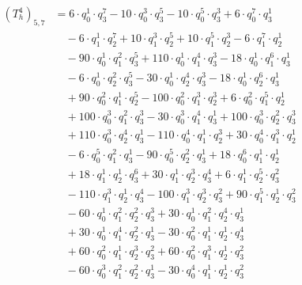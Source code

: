 \begin{align*}(T_{h}^4)_{5,7}&=6\cdot q_0^{1}\cdot q_3^{7}-10\cdot q_0^{3}\cdot q_3^{5}-10\cdot q_0^{5}\cdot q_3^{3}+6\cdot q_0^{7}\cdot q_3^{1}\\
&\quad -6\cdot q_1^{1}\cdot q_2^{7}+10\cdot q_1^{3}\cdot q_2^{5}+10\cdot q_1^{5}\cdot q_2^{3}-6\cdot q_1^{7}\cdot q_2^{1}\\
&\quad -90\cdot q_0^{1}\cdot q_1^{2}\cdot q_3^{5}+110\cdot q_0^{1}\cdot q_1^{4}\cdot q_3^{3}-18\cdot q_0^{1}\cdot q_1^{6}\cdot q_3^{1}\\
&\quad -6\cdot q_0^{1}\cdot q_2^{2}\cdot q_3^{5}-30\cdot q_0^{1}\cdot q_2^{4}\cdot q_3^{3}-18\cdot q_0^{1}\cdot q_2^{6}\cdot q_3^{1}\\
&\quad +90\cdot q_0^{2}\cdot q_1^{1}\cdot q_2^{5}-100\cdot q_0^{2}\cdot q_1^{3}\cdot q_2^{3}+6\cdot q_0^{2}\cdot q_1^{5}\cdot q_2^{1}\\
&\quad +100\cdot q_0^{3}\cdot q_1^{2}\cdot q_3^{3}-30\cdot q_0^{3}\cdot q_1^{4}\cdot q_3^{1}+100\cdot q_0^{3}\cdot q_2^{2}\cdot q_3^{3}\\
&\quad +110\cdot q_0^{3}\cdot q_2^{4}\cdot q_3^{1}-110\cdot q_0^{4}\cdot q_1^{1}\cdot q_2^{3}+30\cdot q_0^{4}\cdot q_1^{3}\cdot q_2^{1}\\
&\quad -6\cdot q_0^{5}\cdot q_1^{2}\cdot q_3^{1}-90\cdot q_0^{5}\cdot q_2^{2}\cdot q_3^{1}+18\cdot q_0^{6}\cdot q_1^{1}\cdot q_2^{1}\\
&\quad +18\cdot q_1^{1}\cdot q_2^{1}\cdot q_3^{6}+30\cdot q_1^{1}\cdot q_2^{3}\cdot q_3^{4}+6\cdot q_1^{1}\cdot q_2^{5}\cdot q_3^{2}\\
&\quad -110\cdot q_1^{3}\cdot q_2^{1}\cdot q_3^{4}-100\cdot q_1^{3}\cdot q_2^{3}\cdot q_3^{2}+90\cdot q_1^{5}\cdot q_2^{1}\cdot q_3^{2}\\
&\quad -60\cdot q_0^{1}\cdot q_1^{2}\cdot q_2^{2}\cdot q_3^{3}+30\cdot q_0^{1}\cdot q_1^{2}\cdot q_2^{4}\cdot q_3^{1}\\
&\quad +30\cdot q_0^{1}\cdot q_1^{4}\cdot q_2^{2}\cdot q_3^{1}-30\cdot q_0^{2}\cdot q_1^{1}\cdot q_2^{1}\cdot q_3^{4}\\
&\quad +60\cdot q_0^{2}\cdot q_1^{1}\cdot q_2^{3}\cdot q_3^{2}+60\cdot q_0^{2}\cdot q_1^{3}\cdot q_2^{1}\cdot q_3^{2}\\
&\quad -60\cdot q_0^{3}\cdot q_1^{2}\cdot q_2^{2}\cdot q_3^{1}-30\cdot q_0^{4}\cdot q_1^{1}\cdot q_2^{1}\cdot q_3^{2}\end{align*}
